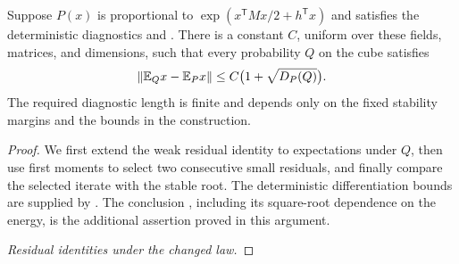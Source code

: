 \begin{lemma}\label{lem:stat-mean}
Suppose $P(x)$ is proportional to
$\exp(x^{\mathsf T}Mx/2+h^{\mathsf T}x)$ and satisfies the deterministic
diagnostics and .  There is a constant $C$, uniform
over these fields, matrices, and dimensions, such that every probability
$Q$ on the cube satisfies
\begin{equation}\label{eq:stat-mean}
 \left\lVert \mathbb E_Qx-\mathbb E_Px\right\rVert\le C\bigl(1+\sqrt{D_P(Q)}\bigr).
\end{equation}
The required diagnostic length is finite and depends only on the fixed
stability margins and the bounds in the construction.
\end{lemma}

\begin{proof}
We first extend the weak residual identity to expectations under $Q$,
then use first moments to select two consecutive small residuals, and
finally compare the selected iterate with the stable root.  The
deterministic differentiation bounds are supplied by
\cite[Lemmas~5.7, 6.1, 6.3, and~6.4]{SKGap}.  The conclusion
, including its square-root dependence on the energy,
is the additional assertion proved in this argument.

\emph{Residual identities under the changed law.}


\end{proof}
